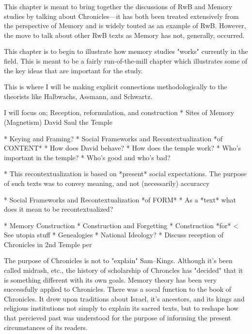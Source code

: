 
This chapter is meant to bring together the discussions of RwB and Memory studies by talking about Chronicles—it has both been treated extensively from the perspective of Memory and is widely touted as an example of RwB. However, the move to talk about other RwB texts as Memory has not, generally, occurred.

This chapter is to begin to illustrate how memory studies "works" currently in the field. This is meant to be a fairly run-of-the-mill chapter which illustrates some of the key ideas that are important for the study.

This is where I will be making explicit connections methodologically to the theorists like Halbwachs, Assmann, and Schwartz.

I will focus on; Reception, reformulation, and construction
    * Sites of Memory (Magnetism)
        David
        Saul
        the Temple
    
    * Keying and Framing?
    * Social Frameworks and Recontextualization *of CONTENT*
        * How does David behave?
        * How does the temple work?
        * Who's important in the temple?
        * Who's good and who's bad?

        * This recontextualization is based on *present* social expectations. The purpose of such texts was to convey meaning, and not (necessarily) accuraccy

    * Social Frameworks and Recontextualization *of FORM*
        * As a *text* what does it mean to be recontextualized?
    
    * Memory Construction
        * Construction and Forgetting
        * Construction *for* < See utopia stuff
            * Genealogies
            * National Ideology? 
        * Discuss reception of Chronicles in 2nd Temple per

    The purpose of Chronicles is not to "explain" Sam--Kings. Although it's been called midrash, etc., the history of scholarship of Chroncles has "decided" that it is something different with its own goals. Memory theory has been very successfully applied to Chronicles. There was a socal function to the book of Chronicles. It drew upon traditions about Israel, it's ancestors, and its kings and religious institutions not simply to explain its sacred texts, but to reshape how that percieved past was understood for the purpose of informing the present circumstances of its readers. 

    